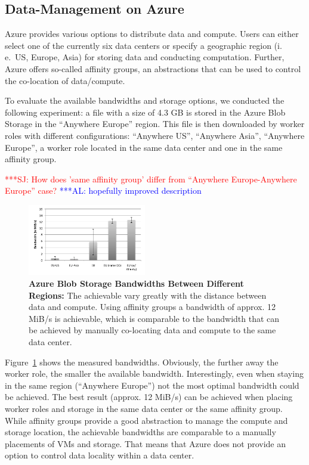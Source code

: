 \documentclass[conference,final]{IEEEtran}
\newcommand{\alnote}[1]{ {\textcolor{blue} { ***AL: #1 }}}
\newcommand{\jhanote}[1]{ {\textcolor{red} { ***SJ: #1 }}}
\newcommand{\alnote}[1]{}
\newcommand{\jhanote}[1]{}
\begin{document}
\subsection{Data-Management on Azure}

Azure provides various options to distribute data and
compute. Users can either select one of the currently six data centers or 
specify a geographic region (i.\,e.\ US, Europe, Asia) for storing data and
conducting computation. Further, Azure offers so-called affinity groups, 
an abstractions that can be used to control the co-location of data/compute.

To evaluate the available bandwidths and storage options, we conducted 
the following experiment: a file with a size of 4.3 GB is stored in the Azure Blob Storage in
the ``Anywhere Europe'' region. This file is then downloaded by worker
roles with different configurations: ``Anywhere US'', ``Anywhere
Asia'', ``Anywhere Europe'', a worker role located in the same
data center and one in the same affinity group. 

\jhanote{How does 'same affinity group' differ from ``Anywhere
  Europe-Anywhere Europe'' case?}\alnote{hopefully improved description}

\begin{figure}[htbp]
    \centering
        \includegraphics[width=0.46\textwidth]{performance/azure-data-transfer.pdf}
    \caption{\textbf{Azure Blob Storage Bandwidths Between Different Regions:} The achievable vary
    greatly with the distance between data and compute. Using affinity groups a bandwidth
    of approx. 12 MiB/s is achievable, which is comparable to the bandwidth that can
    be achieved by manually co-locating data and compute to the same data center.
    }
    \label{fig:performance_azure-data-transfer}
\end{figure}
Figure~\ref{fig:performance_azure-data-transfer} shows the measured
bandwidths. Obviously, the further away the worker role, the smaller
the available bandwidth. Interestingly, even when staying in the same
region (``Anywhere Europe'') not the most optimal bandwidth could be
achieved. The best result (approx. 12 MiB/s) can be achieved when
placing worker roles and storage in the same data center or the 
same affinity group. While affinity groups provide a good abstraction
to manage the compute and storage location, the achievable bandwidths
are comparable to a manually placements of VMs and storage. That means 
that Azure does not provide an option to control data locality within
a data center.
\end{document}
